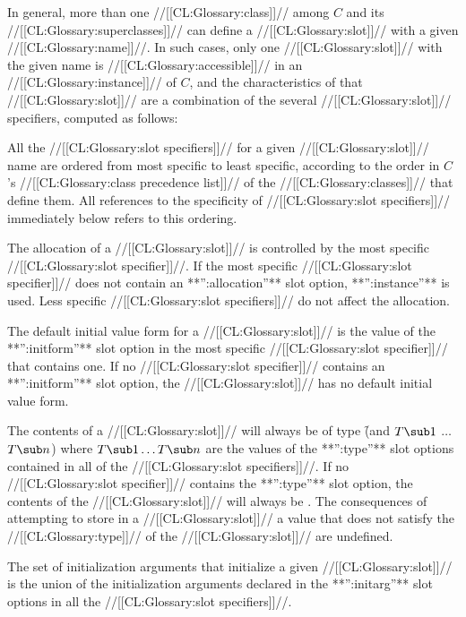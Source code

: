 In general, more than one //[[CL:Glossary:class]]// among $C$ and its  //[[CL:Glossary:superclasses]]// can define a //[[CL:Glossary:slot]]// with a given //[[CL:Glossary:name]]//.   In such cases, only one //[[CL:Glossary:slot]]// with the given name is //[[CL:Glossary:accessible]]// in an //[[CL:Glossary:instance]]//  of $C$\negthinspace, and the characteristics of that //[[CL:Glossary:slot]]// are  a combination of the several //[[CL:Glossary:slot]]// specifiers, computed as follows:

\beginlist

\itemitem{\bull} All the //[[CL:Glossary:slot specifiers]]// for a given //[[CL:Glossary:slot]]// name are ordered from most specific to least specific, according to the order in $C$'s //[[CL:Glossary:class precedence list]]// of the //[[CL:Glossary:classes]]// that define them. All references to the specificity of //[[CL:Glossary:slot specifiers]]// immediately below refers to this ordering.

\itemitem{\bull} The allocation of a //[[CL:Glossary:slot]]// is controlled by the most  specific //[[CL:Glossary:slot specifier]]//.  If the most specific //[[CL:Glossary:slot specifier]]//  does not contain an **'':allocation''** slot option, **'':instance''** is used. Less specific //[[CL:Glossary:slot specifiers]]// do not affect the allocation.

\itemitem{\bull} The default initial value form for a //[[CL:Glossary:slot]]//  is the value of the **'':initform''** slot option in the most specific //[[CL:Glossary:slot specifier]]// that contains one.  If no //[[CL:Glossary:slot specifier]]// contains an **'':initform''** slot option, the //[[CL:Glossary:slot]]//  has no default initial value form.

\itemitem{\bull} The contents of a //[[CL:Glossary:slot]]// will always be of type  \f{(and $T\sub 1$ $\ldots$ $T\sub n$)} where $T\sub 1 \ldots T\sub n$ are the values of the **'':type''** slot options contained in all of the //[[CL:Glossary:slot specifiers]]//.  If no //[[CL:Glossary:slot specifier]]// contains the **'':type''** slot option, the contents of the //[[CL:Glossary:slot]]// will always be  . The consequences of attempting to store in a //[[CL:Glossary:slot]]// a value that does not satisfy the //[[CL:Glossary:type]]// of the //[[CL:Glossary:slot]]// are undefined.

\itemitem{\bull} The set of initialization arguments that initialize a  given //[[CL:Glossary:slot]]// is the union of the initialization arguments declared in the **'':initarg''** slot options in all the //[[CL:Glossary:slot specifiers]]//.


